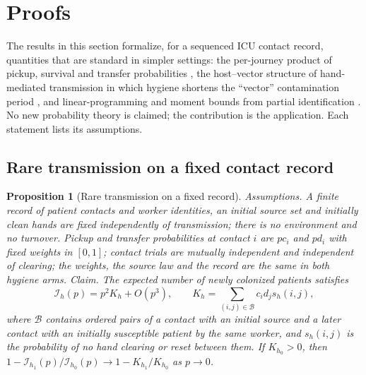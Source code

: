 \documentclass[11pt]{article}
\newtheorem{proposition}{Proposition}
\begin{document}
\section{Proofs}\label{sec:s-proofs}
The results in this section formalize, for a sequenced ICU contact record,
quantities that are standard in simpler settings: the per-journey product of
pickup, survival and transfer probabilities \citep{beggs2009}, the host--vector
structure of hand-mediated transmission in which hygiene shortens the
``vector'' contamination period \citep{austin1999}, and linear-programming and
moment bounds from partial identification
\citep{manski2003,tamer2010,bertsimas2005,madansky1959}. No new probability
theory is claimed; the contribution is the application. Each statement lists its
assumptions.

\subsection{Rare transmission on a fixed contact record}\label{sec:s-proof-fixed}
\begin{proposition}[Rare transmission on a fixed record]\label{prop:fixed}
\emph{Assumptions.} A finite record of patient contacts and worker identities,
an initial source set and initially clean hands are fixed independently of
transmission; there is no environment and no turnover. Pickup and transfer
probabilities at contact $i$ are $pc_i$ and $pd_i$ with fixed weights in $[0,1]$;
contact trials are mutually independent and independent of clearing; the
weights, the source law and the record are the same in both hygiene arms.
\emph{Claim.} The expected number of newly colonized patients satisfies
\begin{equation}\label{eq:rare}
\mathcal I_h(p)=p^2K_h+O(p^3),\qquad K_h=\sum_{(i,j)\in\mathcal B}c_id_js_h(i,j),
\end{equation}
where $\mathcal B$ contains ordered pairs of a contact with an initial source and
a later contact with an initially susceptible patient by the same worker, and
$s_h(i,j)$ is the probability of no hand clearing or reset between them. If
$K_{h_0}>0$, then $1-\mathcal I_{h_1}(p)/\mathcal I_{h_0}(p)\to1-K_{h_1}/K_{h_0}$
as $p\to0$.
\end{proposition}
\end{document}
